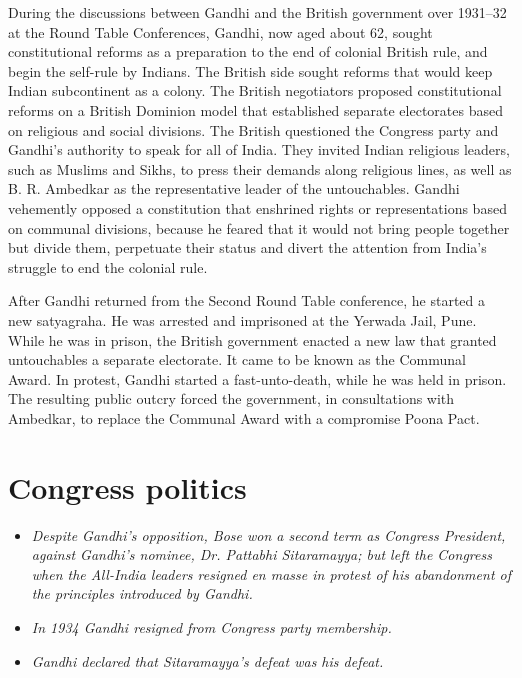 During the discussions between Gandhi and the British government over
1931--32 at the Round Table Conferences, Gandhi, now aged about 62,
sought constitutional reforms as a preparation to the end of colonial
British rule, and begin the self-rule by Indians. The British side
sought reforms that would keep Indian subcontinent as a colony. The
British negotiators proposed constitutional reforms on a British
Dominion model that established separate electorates based on religious
and social divisions. The British questioned the Congress party and
Gandhi's authority to speak for all of India. They invited Indian
religious leaders, such as Muslims and Sikhs, to press their demands
along religious lines, as well as B. R. Ambedkar as the representative
leader of the untouchables. Gandhi vehemently opposed a constitution
that enshrined rights or representations based on communal divisions,
because he feared that it would not bring people together but divide
them, perpetuate their status and divert the attention from India's
struggle to end the colonial rule.

After Gandhi returned from the Second Round Table conference, he started
a new satyagraha. He was arrested and imprisoned at the Yerwada Jail,
Pune. While he was in prison, the British government enacted a new law
that granted untouchables a separate electorate. It came to be known as
the Communal Award. In protest, Gandhi started a fast-unto-death, while
he was held in prison. The resulting public outcry forced the
government, in consultations with Ambedkar, to replace the Communal
Award with a compromise Poona Pact.

\section{Congress politics}\label{congress-politics}

\begin{itemize}
\item
  \emph{Despite Gandhi's opposition, Bose won a second term as Congress
  President, against Gandhi's nominee, Dr. Pattabhi Sitaramayya; but
  left the Congress when the All-India leaders resigned en masse in
  protest of his abandonment of the principles introduced by Gandhi.}
\item
  \emph{In 1934 Gandhi resigned from Congress party membership.}
\item
  \emph{Gandhi declared that Sitaramayya's defeat was his defeat.}
\end{itemize}


